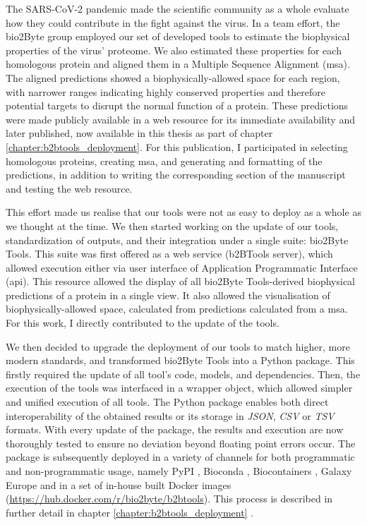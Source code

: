 The SARS-CoV-2 pandemic made the scientific community as a whole evaluate how they could contribute in the fight against the virus. In a team effort, the bio2Byte group employed our set of developed tools to estimate the biophysical properties of the virus' proteome. We also estimated these properties for each homologous protein and aligned them in a Multiple Sequence Alignment (\gls{msa}). The aligned predictions showed a biophysically-allowed space for each region, with narrower ranges indicating highly conserved properties and therefore potential targets to disrupt the normal function of a protein. These predictions were made publicly available in a web resource for its immediate availability and later published, now available in this thesis as part of chapter \ref{chapter:b2btools_deployment}. For this publication, I participated in selecting homologous proteins, creating \gls{msa}, and generating and formatting of the predictions, in addition to writing the corresponding section of the manuscript and testing the web resource.  

This effort made us realise that our tools were not as easy to deploy as a whole as we thought at the time. We then started working on the update of our tools, standardization of outputs, and their integration under a single suite: bio2Byte Tools. This suite was first offered as a web service (b2BTools server), which allowed execution either via user interface of Application Programmatic Interface (\gls{api}). This resource allowed the display of all bio2Byte Tools-derived biophysical predictions of a protein in a single view. It also allowed the visualisation of biophysically-allowed space, calculated from predictions calculated from a \gls{msa}. For this work, I directly contributed to the update of the tools.

We then decided to upgrade the deployment of our tools to match higher, more modern standards, and transformed bio2Byte Tools into a Python package. This firstly required the update of all tool's code, models, and dependencies. Then, the execution of the tools was interfaced in a wrapper object, which allowed simpler and unified execution of all tools. The Python package enables both direct interoperability of the obtained results or its storage in \textit{JSON}, \textit{CSV} or \textit{TSV} formats. With every update of the package, the results and execution are now thoroughly tested to ensure no deviation beyond floating point errors occur. The package is subsequently deployed in a variety of channels for both programmatic and non-programmatic usage, namely PyPI \cite{pypi}, Bioconda \cite{gruning_bioconda_2018}, Biocontainers \cite{da_veiga_leprevost_biocontainers_2017}, Galaxy Europe \cite{afgan_galaxy_2018} and in a set of in-house built Docker images (\href{https://hub.docker.com/r/bio2byte/b2btools}{https://hub.docker.com/r/bio2byte/b2btools}). This process is described in further detail in chapter \ref{chapter:b2btools_deployment} \cite{gavalda-garcia_bio2byte_2024}. 

